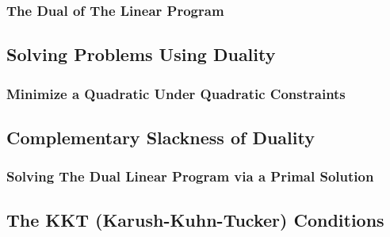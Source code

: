 \documentclass{article}
\begin{document}
\subsubsection{The Dual of The Linear Program}

\subsection{Solving Problems Using Duality}

\subsubsection{Minimize a Quadratic Under Quadratic Constraints}

\subsection{Complementary Slackness of Duality}

\subsubsection{Solving The Dual Linear Program via a Primal Solution}

\subsection{The KKT (Karush-Kuhn-Tucker) Conditions}
\end{document}
